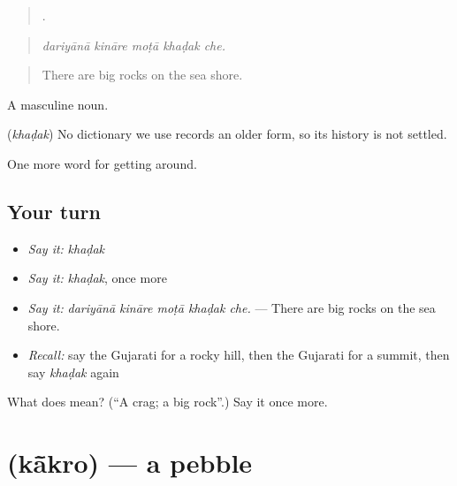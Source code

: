 \begin{quote}
    .
\end{quote}

\begin{quote}
\emph{dariyānā kināre moṭā khaḍak che.}
\end{quote}

\begin{quote}
There are big rocks on the sea shore.
\end{quote}

A masculine noun.

\begin{cousinweb}
\textbf{} (\emph{khaḍak}) No dictionary we use records an older form, so its history is not settled.
\end{cousinweb}

\begin{grammarlens}[title={What you've built}]
One more word for getting around.
\end{grammarlens}

\subsection*{Your turn}
\begin{itemize}
\raggedright
  \item \emph{Say it:} \emph{khaḍak}
  \item \emph{Say it:} \emph{khaḍak}, once more
  \item \emph{Say it:} \emph{dariyānā kināre moṭā khaḍak che.} — There are big rocks on the sea shore.
  \item \emph{Recall:} say the Gujarati for a rocky hill, then the Gujarati for a summit, then say \emph{khaḍak} again
\end{itemize}

\begin{tcolorbox}[breakable,colback=teal!4,colframe=teal!35!black,title={Before you move on}]
What does  mean? (\textquotedblleft{}A crag; a big rock\textquotedblright{}.) Say it once more.
\end{tcolorbox}
\section[\texorpdfstring{\gu{કાંકરો} (kā̃kro)}{કાંકરો (kā̃kro)}]{ (kā̃kro) — a pebble}

\label{lesson:GU-C439-kakro}



